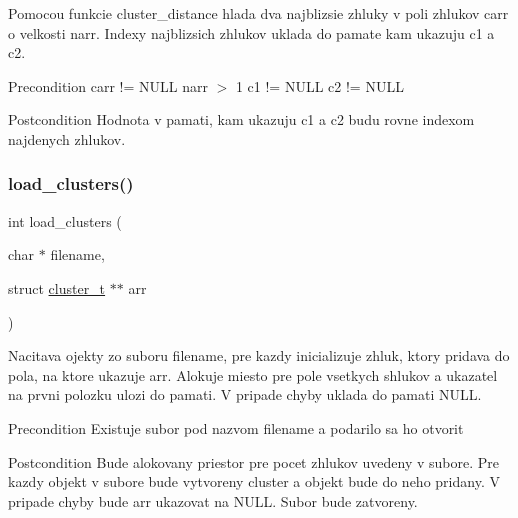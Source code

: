 Pomocou funkcie \textquotesingle{}cluster\+\_\+distance\textquotesingle{} hlada dva najblizsie zhluky v poli zhlukov \textquotesingle{}carr\textquotesingle{} o velkosti \textquotesingle{}narr\textquotesingle{}. Indexy najblizsich zhlukov uklada do pamate kam ukazuju \textquotesingle{}c1\textquotesingle{} a \textquotesingle{}c2\textquotesingle{}.

\begin{DoxyPrecond}{Precondition}
carr != N\+U\+LL narr $>$ 1 c1 != N\+U\+LL c2 != N\+U\+LL
\end{DoxyPrecond}
\begin{DoxyPostcond}{Postcondition}
Hodnota v pamati, kam ukazuju \textquotesingle{}c1\textquotesingle{} a \textquotesingle{}c2\textquotesingle{} budu rovne indexom najdenych zhlukov. 
\end{DoxyPostcond}
\mbox{\label{group__clusts_ga9d928923d43120cb53ddff210a087061}} 
\subsubsection{\texorpdfstring{load\+\_\+clusters()}{load\_clusters()}}
{\footnotesize\ttfamily int load\+\_\+clusters (\begin{DoxyParamCaption}\item[{char $\ast$}]{filename,  }\item[{struct \hyperlink{structcluster__t}{cluster\+\_\+t} $\ast$$\ast$}]{arr }\end{DoxyParamCaption})}

Nacitava ojekty zo suboru \textquotesingle{}filename\textquotesingle{}, pre kazdy inicializuje zhluk, ktory pridava do pola, na ktore ukazuje \textquotesingle{}arr\textquotesingle{}. Alokuje miesto pre pole vsetkych shlukov a ukazatel na prvni polozku ulozi do pamati. V pripade chyby uklada do pamati N\+U\+LL.

\begin{DoxyPrecond}{Precondition}
Existuje subor pod nazvom \textquotesingle{}filename\textquotesingle{} a podarilo sa ho otvorit
\end{DoxyPrecond}
\begin{DoxyPostcond}{Postcondition}
Bude alokovany priestor pre pocet zhlukov uvedeny v subore. Pre kazdy objekt v subore bude vytvoreny cluster a objekt bude do neho pridany. V pripade chyby bude \textquotesingle{}arr\textquotesingle{} ukazovat na N\+U\+LL. Subor bude zatvoreny.
\end{DoxyPostcond}

